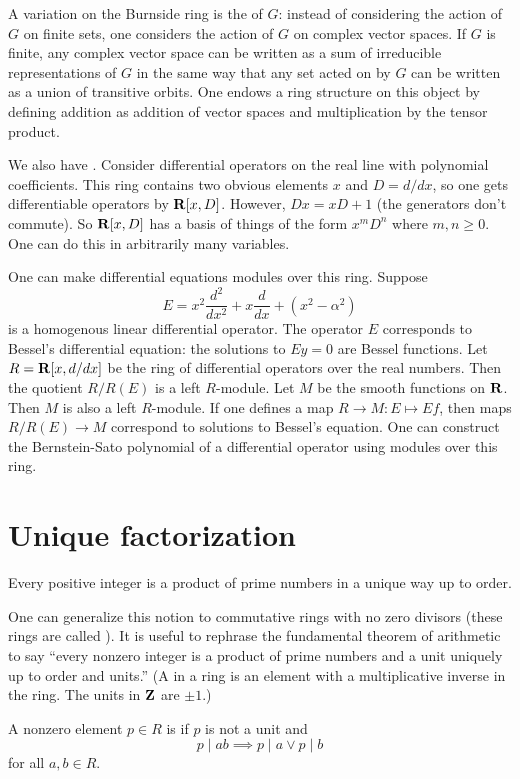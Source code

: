 \documentclass[11pt, oneside,margin=1in]{article}
\begin{document}
A variation on the Burnside ring is the  of $G$: instead of considering the action of $G$ on finite sets, one considers the action of $G$ on complex vector spaces. If $G$ is finite, any complex vector space can be written as a sum of irreducible representations of $G$ in the same way that any set acted on by $G$ can be written as a union of transitive orbits. One endows a ring structure on this object by defining addition as addition of vector spaces and multiplication by the tensor product.

We also have . Consider differential operators on the real line with polynomial coefficients. This ring contains two obvious elements $x$ and $ D =  d/ d x$, so one gets differentiable operators by $\mathbf R[x,  D]$. However, $ D x = x D + 1$ (the generators don't commute). So $\mathbf R[x, D]$ has a basis of things of the form $x^m D^n$ where $m,n\ge 0$. One can do this in arbitrarily many variables.

One can make differential equations modules over this ring. Suppose 
$$
 E= x^2\frac{d^2}{dx^2}+ x\frac{d}{dx}+ (x^2-\alpha^2)
$$
is a homogenous linear differential operator. The operator ${E}$ corresponds to Bessel's differential equation: the solutions to ${E}y=0$ are Bessel functions. Let $R = \mathbf R[x, d/ dx]$ be the ring of differential operators over the real numbers. Then the quotient $R/R( E)$ is a left $R$-module. Let $M$ be the smooth functions on $\mathbf R$. Then $M$ is also a left $R$-module. If one defines a map $R\longrightarrow M:  E \longmapsto  E f$, then maps $R/R( E)\longrightarrow M$ correspond to solutions to Bessel's equation. One can construct the Bernstein-Sato polynomial of a differential operator using modules over this ring.

\section{Unique factorization}
\begin{thm}
Every positive integer is a product of prime numbers in a unique way up to order.
\end{thm}

One can generalize this notion to commutative rings with no zero divisors (these rings are called ). It is useful to rephrase the fundamental theorem of arithmetic to say ``every nonzero integer is a product of prime numbers and a unit uniquely up to order and units.'' (A  in a ring is an element with a multiplicative inverse in the ring. The units in $\mathbf Z$ are $\pm1$.)
\begin{definition}
A nonzero element $p\in R$ is  if $p$ is not a unit and 
$$
p\mid ab \implies p\mid a \lor p\mid b
$$
for all $a,b\in R$.
\end{definition}
\end{document}
